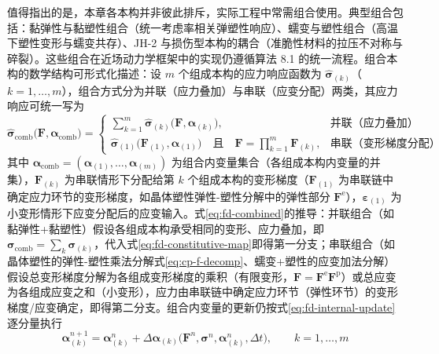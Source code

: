 值得指出的是，本章各本构并非彼此排斥，实际工程中常需组合使用。典型组合包括：黏弹性与黏塑性组合（统一考虑率相关弹塑性响应）、蠕变与塑性组合（高温下塑性变形与蠕变共存）、JH-2 与损伤型本构的耦合（准脆性材料的拉压不对称与碎裂）。这些组合在近场动力学框架中的实现仍遵循算法 8.1 的统一流程。组合本构的数学结构可形式化描述：设 $m$ 个组成本构的应力响应函数为 $\hat{\boldsymbol{\sigma}}_{(k)}$（$k=1,\ldots,m$），组合方式分为并联（应力叠加）与串联（应变分配）两类，其应力响应可统一写为
\begin{equation}
  \hat{\boldsymbol{\sigma}}_{\mathrm{comb}}\bigl(\mathbf{F},\boldsymbol{\alpha}_{\mathrm{comb}}\bigr)
  =
  \begin{cases}
    \displaystyle\sum_{k=1}^{m}\hat{\boldsymbol{\sigma}}_{(k)}\bigl(\mathbf{F},\boldsymbol{\alpha}_{(k)}\bigr), & \text{并联（应力叠加）}\\
    \hat{\boldsymbol{\sigma}}_{(1)}\bigl(\mathbf{F}_{(1)},\boldsymbol{\alpha}_{(1)}\bigr)
    \quad\text{且}\quad
    \mathbf{F}=\prod_{k=1}^{m}\mathbf{F}_{(k)}, & \text{串联（变形梯度分配）}
  \end{cases}
  \label{eq:fd-combined}
\end{equation}
其中 $\boldsymbol{\alpha}_{\mathrm{comb}}=(\boldsymbol{\alpha}_{(1)},\ldots,\boldsymbol{\alpha}_{(m)})$ 为组合内变量集合（各组成本构内变量的并集），$\mathbf{F}_{(k)}$ 为串联情形下分配给第 $k$ 个组成本构的变形梯度（$\mathbf{F}_{(1)}$ 为串联链中确定应力环节的变形梯度，如晶体塑性弹性-塑性分解中的弹性部分 $\mathbf{F}^{\mathrm{e}}$），$\boldsymbol{\varepsilon}_{(1)}$ 为小变形情形下应变分配后的应变输入。式\eqref{eq:fd-combined}的推导：并联组合（如黏弹性+黏塑性）假设各组成本构承受相同的变形、应力叠加，即 $\boldsymbol{\sigma}_{\mathrm{comb}}=\sum_{k}\boldsymbol{\sigma}_{(k)}$，代入式\eqref{eq:fd-constitutive-map}即得第一分支；串联组合（如晶体塑性的弹性-塑性乘法分解式\eqref{eq:cp-f-decomp}、蠕变+塑性的应变加法分解）假设总变形梯度分解为各组成变形梯度的乘积（有限变形，$\mathbf{F}=\mathbf{F}^{\mathrm{e}}\mathbf{F}^{\mathrm{p}}$）或总应变为各组成应变之和（小变形），应力由串联链中确定应力环节（弹性环节）的变形梯度/应变确定，即得第二分支。组合内变量的更新仍按式\eqref{eq:fd-internal-update}逐分量执行
\begin{equation}
  \boldsymbol{\alpha}_{(k)}^{n+1}
  =\boldsymbol{\alpha}_{(k)}^{n}+\Delta\boldsymbol{\alpha}_{(k)}
  \bigl(\mathbf{F}^{n},\boldsymbol{\sigma}^{n},\boldsymbol{\alpha}_{(k)}^{n},\Delta t\bigr),
  \qquad k=1,\ldots,m
  \label{eq:fd-combined-internal}
\end{equation}
